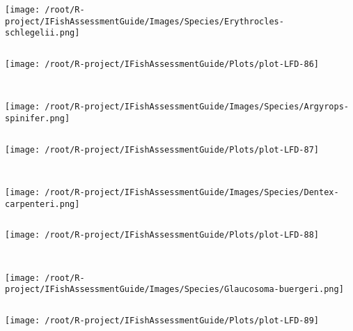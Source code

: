 \documentclass{report}\usepackage[]{graphicx}\usepackage[]{color}
\makeatletter
\def\maxwidth{ %
  \ifdim\Gin@nat@width>\linewidth
    \linewidth
  \else
    \Gin@nat@width
  \fi
}
\newenvironment{kframe}{%
 \def\at@end@of@kframe{}%
 \ifinner\ifhmode%
  \def\at@end@of@kframe{\end{minipage}}%
  \begin{minipage}{\columnwidth}%
 \fi\fi%
 \def\FrameCommand##1{\hskip\@totalleftmargin \hskip-\fboxsep
 \colorbox{shadecolor}{##1}\hskip-\fboxsep
     \hskip-\linewidth \hskip-\@totalleftmargin \hskip\columnwidth}%
 \MakeFramed {\advance\hsize-\width
   \@totalleftmargin\z@ \linewidth\hsize
   \@setminipage}}%
 {\par\unskip\endMakeFramed%
 \at@end@of@kframe}
\newenvironment{knitrout}{}{} %
\makeatother
\begin{document}
\begin{knitrout}
\begin{kframe}
\begin{verbatim}
\end{verbatim}
\end{kframe}
\texttt{[image: /root/R-project/IFishAssessmentGuide/Images/Species/Erythrocles-schlegelii.png]}
\begin{kframe}\begin{verbatim}
\end{verbatim}
\end{kframe}
\texttt{[image: /root/R-project/IFishAssessmentGuide/Plots/plot-LFD-86]} 
\begin{kframe}\begin{verbatim}
 
\end{verbatim}
\end{kframe}
\texttt{[image: /root/R-project/IFishAssessmentGuide/Images/Species/Argyrops-spinifer.png]}
\begin{kframe}\begin{verbatim}
\end{verbatim}
\end{kframe}
\texttt{[image: /root/R-project/IFishAssessmentGuide/Plots/plot-LFD-87]} 
\begin{kframe}\begin{verbatim}
 
\end{verbatim}
\end{kframe}
\texttt{[image: /root/R-project/IFishAssessmentGuide/Images/Species/Dentex-carpenteri.png]}
\begin{kframe}\begin{verbatim}
\end{verbatim}
\end{kframe}
\texttt{[image: /root/R-project/IFishAssessmentGuide/Plots/plot-LFD-88]} 
\begin{kframe}\begin{verbatim}
 
\end{verbatim}
\end{kframe}
\texttt{[image: /root/R-project/IFishAssessmentGuide/Images/Species/Glaucosoma-buergeri.png]}
\begin{kframe}\begin{verbatim}
\end{verbatim}
\end{kframe}
\texttt{[image: /root/R-project/IFishAssessmentGuide/Plots/plot-LFD-89]} 
\begin{kframe}\begin{verbatim}
 

\end{verbatim}
\end{kframe}
\end{knitrout}
\end{document}
